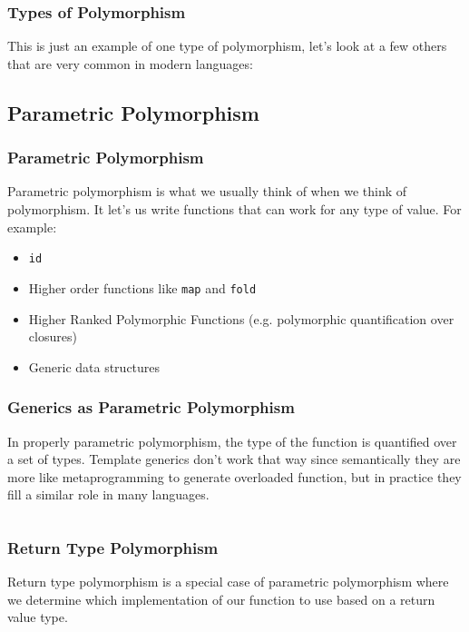 \documentclass{beamer}
\begin{document}
\begin{frame}
  \frametitle{Types of Polymorphism}
  This is just an example of one type of polymorphism, let's look at a
  few others that are very common in modern languages:
\end{frame}

\subsection{Parametric  Polymorphism}

\begin{frame}
  \frametitle{Parametric Polymorphism}
  Parametric polymorphism is what we usually think of when we think of
  polymorphism.  It let's us write functions that can work for any
  type of value.  For example:
  \pause
  \begin{itemize}
  \item \texttt{id}
    \pause
  \item Higher order functions like \texttt{map} and \texttt{fold}
    \pause
  \item Higher Ranked Polymorphic Functions (e.g. polymorphic quantification over closures)
    \pause
  \item Generic data structures
  \end{itemize}
\end{frame}

\begin{frame}[fragile]
  \frametitle{Generics as Parametric Polymorphism}
  In properly parametric polymorphism, the type of the function is
  quantified over a set of types.  Template generics don't work that
  way since semantically they are more like metaprogramming to
  generate overloaded function, but in practice they fill a similar
  role in many languages.
  \begin{center}
\begin{lstlisting}[language=Golang]
% func id(type T)(val T) T { return val ; }
\end{lstlisting}
  \end{center}
\end{frame}

\begin{frame}[fragile]
  \frametitle{Return Type Polymorphism}
  Return type polymorphism is a special case of parametric
  polymorphism where we determine which implementation of our function
  to use based on a return value type.
  \begin{center}
\begin{lstlisting}[language=Golang]
% func parse(type T)(unparsed string) (T, error);
\end{lstlisting}
    \end{center}
\end{frame}
\end{document}
